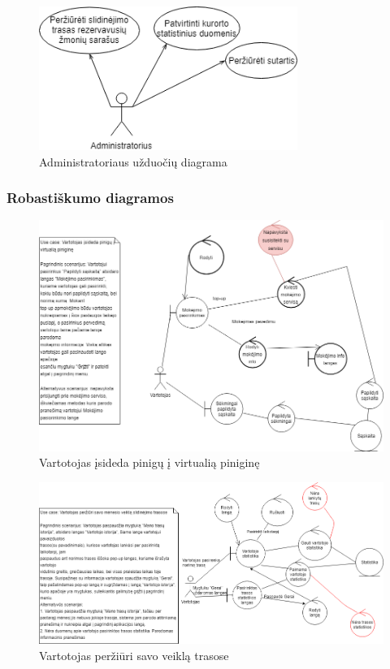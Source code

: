\documentclass[oneside]{VUMIFPSkursinis}
\begin{document}
			\begin{figure}[h]
    				\centering
    				\includegraphics[width=0.75\textwidth]{useCaseAdministratorius.png}
    				\caption{Administratoriaus užduočių diagrama}
    				\label{fig:AdministratoriausUseCasel}
			\end{figure}
\pagebreak

	\subsubsection{Robastiškumo diagramos}

			\begin{figure}[h]
    				\centering
    				\includegraphics[width=1\textwidth]{rob1.png}
    				\caption{Vartotojas įsideda pinigų į virtualią piniginę}
    				\label{fig:Vartotojas įsideda pinigų į virtualią piniginę}
			\end{figure}

			\begin{figure}[h]
    				\centering
    				\includegraphics[width=1\textwidth]{rob2.png}
    				\caption{Vartotojas peržiūri savo veiklą trasose}
    				\label{fig:Vartotojas peržiūri savo veiklą trasose}
			\end{figure}
\end{document}
